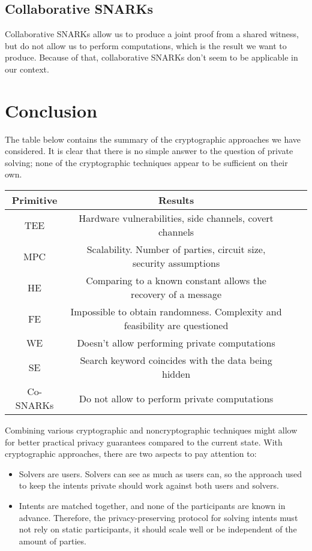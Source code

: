 \documentclass[
    9pt,            %
    report,        %
    affiltop,       %
]{art}
\begin{document}
\subsection{Collaborative SNARKs}

Collaborative SNARKs allow us to produce a joint proof from a shared witness, but do not allow us to perform computations, which is the result we want to produce. Because of that, collaborative SNARKs don't seem to be applicable in our context.

\section{Conclusion}

The table below contains the summary of the cryptographic approaches we have considered. It is clear that there is no simple answer to the question of private solving; none of the cryptographic techniques appear to be sufficient on their own.

\begin{center}
\begin{tabular}{ |c|c|c|c| } 
\hline
 Primitive & Results \\
\hline
\hline
TEE & Hardware vulnerabilities, side channels, covert channels \\ 
\hline
MPC & Scalability. Number of parties, circuit size, security assumptions \\ 
\hline
HE & Comparing to a known constant allows the recovery of a message\\ 
\hline
FE & Impossible to obtain randomness. Complexity and feasibility are questioned \\ 
\hline
WE & Doesn't allow performing private computations \\ 
\hline
SE & Search keyword coincides with the data being hidden\\ 
\hline
Co-SNARKs & Do not allow to perform private computations \\ 

\hline
\end{tabular}
\end{center}

Combining various cryptographic and noncryptographic techniques might allow for better practical privacy guarantees compared to the current state. With cryptographic approaches, there are two aspects to pay attention to:
\begin{itemize}
    \item Solvers are users. Solvers can see as much as users can, so the approach used to keep the intents private should work against both users and solvers.
    \item Intents are matched together, and none of the participants are known in advance. Therefore, the privacy-preserving protocol for solving intents must not rely on static participants, it should scale well or be independent of the amount of parties.
\end{itemize}
\end{document}
